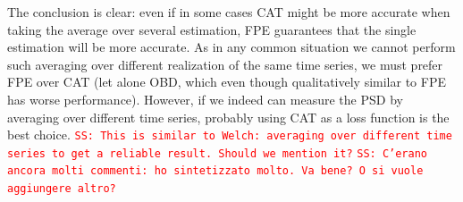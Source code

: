 \documentclass[twocolumn,showpacs,preprintnumbers,nofootinbib,prd,
superscriptaddress,10pt]{revtex4-1}
\newcommand{\sschmidt}[1]{{\textcolor{red}{\texttt{SS: #1}} }}
\begin{document}
The conclusion is clear: even if in some cases CAT might be more accurate when taking the average over several estimation, FPE guarantees that the single estimation will be more accurate.
As in any common situation we cannot perform such averaging over different realization of the same time series, we must prefer FPE over CAT (let alone OBD, which even though qualitatively similar to FPE has worse performance).
However, if we indeed can measure the PSD by averaging over different time series, probably using CAT as a loss function is the best choice.
\sschmidt{This is similar to Welch: averaging over different time series to get a reliable result. Should we mention it?}
\sschmidt{C'erano ancora molti commenti: ho sintetizzato molto. Va bene? O si vuole aggiungere altro?}

\end{document}
